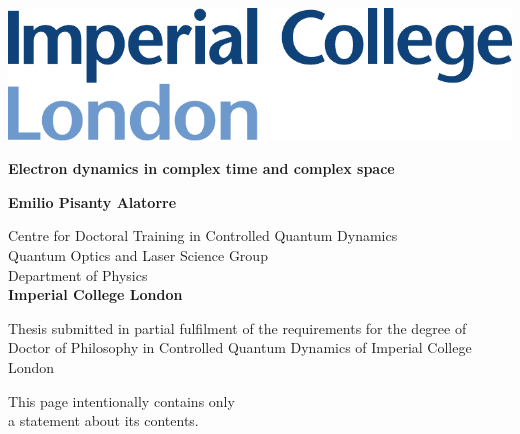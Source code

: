 
\begin{titlepage}


\includegraphics[scale=0.5]{0-Miscellaneous/Images/ImperialLogo.pdf}

\vspace{2cm}

\begin{center}
\textbf{{\Huge Electron dynamics in complex time and complex space}}\\


\vspace{5cm}





{\bf{\Large Emilio Pisanty Alatorre}} 
\\[7mm]
{\titlepagedate}






\vspace{15mm}

Centre for Doctoral Training in Controlled Quantum Dynamics\\[2mm]
Quantum Optics and Laser Science Group\\[2mm]
Department of Physics\\[4mm]

\textbf{Imperial College London}


\vspace{1.5cm}

\begin{minipage}[center]{12cm}
\centering
Thesis submitted in partial fulfilment of the requirements for the degree of Doctor of Philosophy in Controlled Quantum Dynamics of Imperial College London
\end{minipage}





\end{center}

\end{titlepage}

\addtocounter{page}{0}  %

\mbox{}
\vspace{\fill}
\begin{center}
\scriptsize
This page intentionally contains only \\
a statement about its contents. 
\end{center}
\vspace{20mm}

\thispagestyle{empty}

\newpage